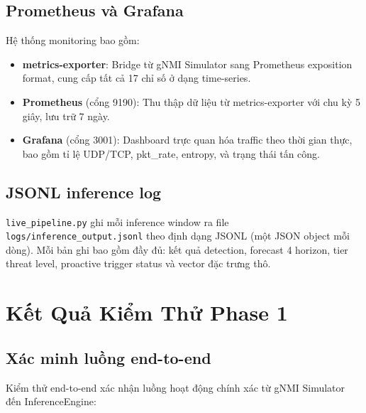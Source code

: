 \documentclass[12pt,a4paper]{article}
\begin{document}
\subsection{Prometheus và Grafana}

Hệ thống monitoring bao gồm:

\begin{itemize}[leftmargin=2em]
\item \textbf{metrics-exporter}: Bridge từ gNMI Simulator sang Prometheus exposition format, cung cấp tất cả 17 chỉ số ở dạng time-series.
\item \textbf{Prometheus} (cổng 9190): Thu thập dữ liệu từ metrics-exporter với chu kỳ 5 giây, lưu trữ 7 ngày.
\item \textbf{Grafana} (cổng 3001): Dashboard trực quan hóa traffic theo thời gian thực, bao gồm tỉ lệ UDP/TCP, pkt\_rate, entropy, và trạng thái tấn công.
\end{itemize}

\subsection{JSONL inference log}

\texttt{live\_pipeline.py} ghi mỗi inference window ra file \texttt{logs/inference\_output.jsonl} theo định dạng JSONL (một JSON object mỗi dòng). Mỗi bản ghi bao gồm đầy đủ: kết quả detection, forecast 4 horizon, tier threat level, proactive trigger status và vector đặc trưng thô.

\section{Kết Quả Kiểm Thử Phase 1}

\subsection{Xác minh luồng end-to-end}

Kiểm thử end-to-end xác nhận luồng hoạt động chính xác từ gNMI Simulator đến InferenceEngine:
\end{document}
